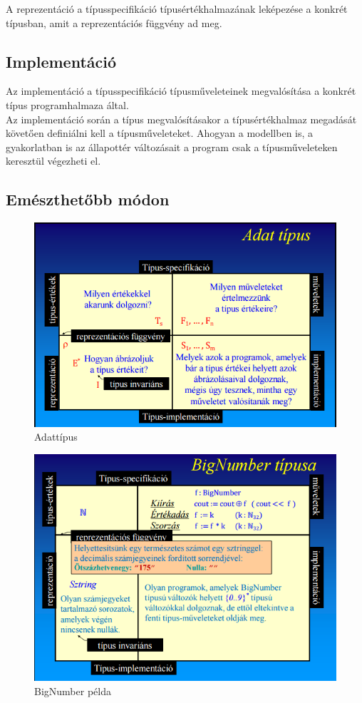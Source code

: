 \documentclass[12pt,margin=0px]{article}
\begin{document}
	\noindent A reprezentáció a típusspecifikáció típusértékhalmazának leképezése a konkrét típusban, amit a reprezentációs függvény ad meg.
	
	\subsection*{Implementáció}
	
	Az implementáció a típusspecifikáció típusműveleteinek megvalósítása a konkrét típus programhalmaza által.\\
	
    \noindent Az implementáció során a típus megvalósításakor a típusértékhalmaz megadását követően definiálni kell a típusműveleteket. Ahogyan a modellben is, a gyakorlatban is az állapottér változásait a program csak a típusműveleteken keresztül végezheti el.
	
	\subsection*{Emészthetőbb módon}
	
	\begin{figure}[H]
		\centering
		\includegraphics[width=0.75\linewidth]{img/adattipus}
		\caption{Adattípus}
		\label{fig:adattipus}
	\end{figure}

	\begin{figure}[H]
		\centering
		\includegraphics[width=0.75\linewidth]{img/adattipus_pelda}
		\caption{BigNumber példa}
		\label{fig:adattipus_pelda}
	\end{figure}	
	\newpage
	
\end{document}

